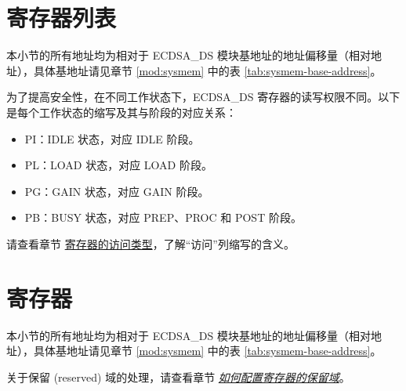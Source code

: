 \documentclass[main\_\_CN.tex]{subfiles}
\begin{document}
\clearpage
\hypertarget{ecdsa-reg-summ}{}
\section{寄存器列表}
\label{sec:ecdsa-reg-summ}

本小节的所有地址均为相对于 ECDSA\_DS 模块基地址的地址偏移量（相对地址），具体基地址请见章节 \ref{mod:sysmem} \textit{} 中的表 \ref{tab:sysmem-base-address}。

为了提高安全性，在不同工作状态下，ECDSA\_DS 寄存器的读写权限不同。以下是每个工作状态的缩写及其与阶段的对应关系：

\begin{itemize}
    \item PI：IDLE 状态，对应 IDLE 阶段。
    \item PL：LOAD 状态，对应 LOAD 阶段。
    \item PG：GAIN 状态，对应 GAIN 阶段。
    \item PB：BUSY 状态，对应 PREP、PROC 和 POST 阶段。
\end{itemize}

请查看章节 \hyperref[glossary-access-types]{寄存器的访问类型}，了解“访问”列缩写的含义。






\clearpage
\section{寄存器}

本小节的所有地址均为相对于 ECDSA\_DS 模块基地址的地址偏移量（相对地址），具体基地址请见章节 \ref{mod:sysmem} \textit{} 中的表 \ref{tab:sysmem-base-address}。

关于保留 (reserved) 域的处理，请查看章节 \hyperref[programming-reserved-field]{\textit{如何配置寄存器的保留域}}。


\end{document}
